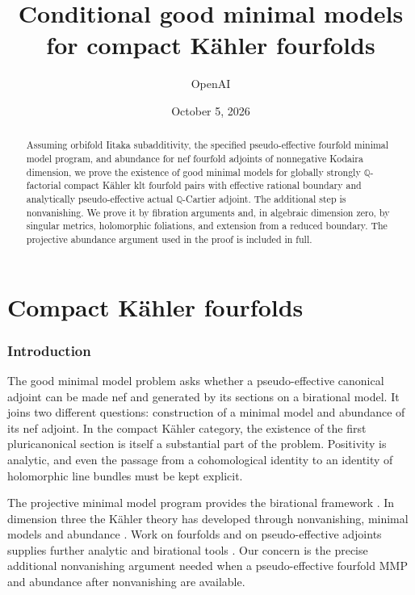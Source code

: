 \documentclass[11pt,letterpaper]{article}
\title{Conditional good minimal models\\for compact K\"ahler fourfolds}
\author{OpenAI}
\date{October 5, 2026}
\newcommand{\Q}{\mathbb{Q}}
\theoremstyle{definition}
\theoremstyle{remark}
\begin{document}
\maketitle
\begin{abstract}
Assuming orbifold Iitaka subadditivity, the specified pseudo-effective
fourfold minimal model program, and abundance for nef fourfold adjoints
of nonnegative Kodaira dimension, we prove the existence of good minimal
models for globally strongly \(\Q\)-factorial compact K\"ahler klt
fourfold pairs with effective rational boundary and analytically
pseudo-effective actual \(\Q\)-Cartier adjoint. The additional step
is nonvanishing. We prove it by
fibration arguments and, in algebraic dimension zero, by singular
metrics, holomorphic foliations, and extension from a reduced boundary.
The projective abundance argument used in the proof is included in full.
\end{abstract}
\tableofcontents
\newpage
\part{Compact K\"ahler fourfolds}
\section{Introduction}\label{sec:introduction}

The good minimal model problem asks whether a pseudo-effective
canonical adjoint can be made nef and generated by its sections on a
birational model. It joins two different questions: construction of a
minimal model and abundance of its nef adjoint. In the compact
K\"ahler category, the existence of the first pluricanonical section
is itself a substantial part of the problem. Positivity is analytic,
and even the passage from a cohomological identity to an identity of
holomorphic line bundles must be kept explicit.

The projective minimal model program provides the birational framework
\cite{BirationalGeometry,BCHM}. In dimension three the K\"ahler
theory has developed through nonvanishing, minimal models and
abundance \cite{DemaillyPeternellNonvanishing,HPMinimalModels,
CHPAbundance,CHPAbundanceErratum,GuenanciaPaunBogomolovGieseker}.
Work on fourfolds and on
pseudo-effective adjoints supplies further analytic and birational
tools \cite{DHPFourfoldMMP,HLLNonvanishing}. Our concern is the
precise additional nonvanishing argument needed when a
pseudo-effective fourfold MMP and abundance after nonvanishing are
available.
\end{document}
